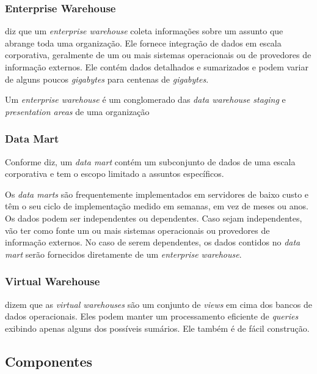 \subsubsection{Enterprise Warehouse}
 diz que um \textit{enterprise warehouse} coleta informações sobre um assunto que abrange toda uma organização. Ele fornece integração de dados em escala corporativa, geralmente de um ou mais sistemas operacionais ou de provedores de informação externos. Ele contém dados detalhados e sumarizados e podem variar de alguns poucos \textit{gigabytes} para centenas de \textit{gigabytes}.

Um \textit{enterprise warehouse} é um conglomerado das \textit{data warehouse staging} e \textit{presentation areas} de uma organização \citep{kimball2002}


\subsubsection{Data Mart}
Conforme  diz, um \textit{data mart} contém um subconjunto de dados de uma escala corporativa e tem o escopo limitado a assuntos específicos.

Os \textit{data marts} são frequentemente implementados em servidores de baixo custo e têm o seu ciclo de implementação medido em semanas, em vez de meses ou anos. Os dados podem ser independentes ou dependentes. Caso sejam independentes, vão ter como fonte um ou mais sistemas operacionais ou provedores de informação externos. No caso de serem dependentes, os dados contidos no \textit{data mart} serão fornecidos diretamente de um \textit{enterprise warehouse}.

\subsubsection{Virtual Warehouse}
 dizem que as \textit{virtual warehouses} são um conjunto de \textit{views} em cima dos bancos de dados operacionais. Eles podem manter um processamento eficiente de \textit{queries} exibindo apenas alguns dos possíveis sumários. Ele também é de fácil construção.

\subsection{Componentes}

